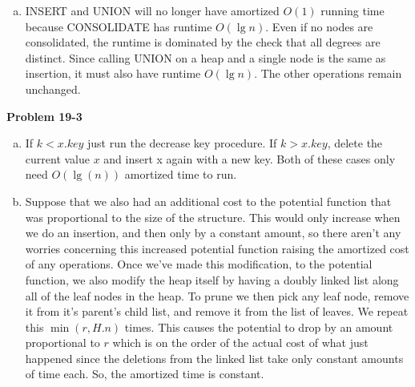 \documentclass{article}
\begin{document}
\begin{enumerate}[a.]
\item INSERT and UNION will no longer have amortized $O(1)$ running time because CONSOLIDATE has runtime $O(\lg n)$.  Even if no nodes are consolidated, the runtime is dominated by the check that all degrees are distinct.  Since calling UNION on a heap and a single node is the same as insertion, it must also have runtime $O(\lg n)$.  The other operations remain unchanged. \\
\end{enumerate}

\noindent\textbf{Problem 19-3}\\
\begin{enumerate}[a.]
\item
If $k<x.key$ just run the decrease key procedure. If $k>x.key$, delete the current value $x$ and insert x again with a new key. Both of these cases only need $O(\lg(n))$ amortized time to run.
\item
Suppose that we also had an additional cost to the potential function that was proportional to the size of the structure. This would only increase when we do an insertion, and then only by a constant amount, so there aren't any worries concerning this increased potential function raising the amortized cost of any operations. Once we've made this modification, to the potential function, we also modify the heap itself by having a doubly linked list along all of the leaf nodes in the heap. To prune we then pick any leaf node, remove it from it's parent's child list, and remove it from the list of leaves. We repeat this $\min(r,H.n)$ times. This causes the potential to drop by an amount proportional to $r$ which is on the order of the actual cost of what just happened since the deletions from the linked list take only constant amounts of time each. So, the amortized time is constant.\\

\end{enumerate}
\end{document}
